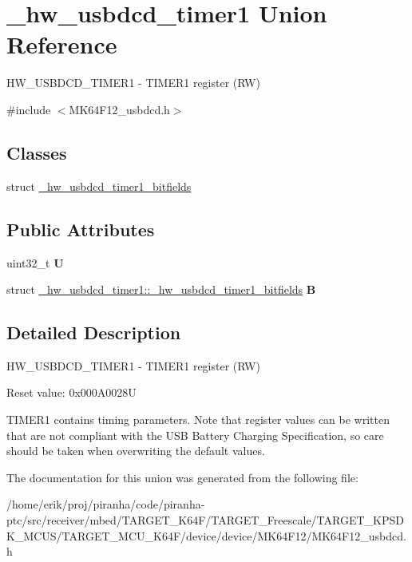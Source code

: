 \hypertarget{union__hw__usbdcd__timer1}{}\section{\+\_\+hw\+\_\+usbdcd\+\_\+timer1 Union Reference}
\label{union__hw__usbdcd__timer1}


H\+W\+\_\+\+U\+S\+B\+D\+C\+D\+\_\+\+T\+I\+M\+E\+R1 -\/ T\+I\+M\+E\+R1 register (RW)  




{\ttfamily \#include $<$M\+K64\+F12\+\_\+usbdcd.\+h$>$}

\subsection*{Classes}
\begin{DoxyCompactItemize}
\item 
struct \hyperlink{struct__hw__usbdcd__timer1_1_1__hw__usbdcd__timer1__bitfields}{\+\_\+hw\+\_\+usbdcd\+\_\+timer1\+\_\+bitfields}
\end{DoxyCompactItemize}
\subsection*{Public Attributes}
\begin{DoxyCompactItemize}
\item 
uint32\+\_\+t {\bfseries U}\hypertarget{union__hw__usbdcd__timer1_a1d2f777afa93879b40c6fa6a25ca0442}{}\label{union__hw__usbdcd__timer1_a1d2f777afa93879b40c6fa6a25ca0442}

\item 
struct \hyperlink{struct__hw__usbdcd__timer1_1_1__hw__usbdcd__timer1__bitfields}{\+\_\+hw\+\_\+usbdcd\+\_\+timer1\+::\+\_\+hw\+\_\+usbdcd\+\_\+timer1\+\_\+bitfields} {\bfseries B}\hypertarget{union__hw__usbdcd__timer1_a5d1ad6c7d9642f5eb287862c16b65526}{}\label{union__hw__usbdcd__timer1_a5d1ad6c7d9642f5eb287862c16b65526}

\end{DoxyCompactItemize}


\subsection{Detailed Description}
H\+W\+\_\+\+U\+S\+B\+D\+C\+D\+\_\+\+T\+I\+M\+E\+R1 -\/ T\+I\+M\+E\+R1 register (RW) 

Reset value\+: 0x000\+A0028U

T\+I\+M\+E\+R1 contains timing parameters. Note that register values can be written that are not compliant with the U\+SB Battery Charging Specification, so care should be taken when overwriting the default values. 

The documentation for this union was generated from the following file\+:\begin{DoxyCompactItemize}
\item 
/home/erik/proj/piranha/code/piranha-\/ptc/src/receiver/mbed/\+T\+A\+R\+G\+E\+T\+\_\+\+K64\+F/\+T\+A\+R\+G\+E\+T\+\_\+\+Freescale/\+T\+A\+R\+G\+E\+T\+\_\+\+K\+P\+S\+D\+K\+\_\+\+M\+C\+U\+S/\+T\+A\+R\+G\+E\+T\+\_\+\+M\+C\+U\+\_\+\+K64\+F/device/device/\+M\+K64\+F12/M\+K64\+F12\+\_\+usbdcd.\+h\end{DoxyCompactItemize}
